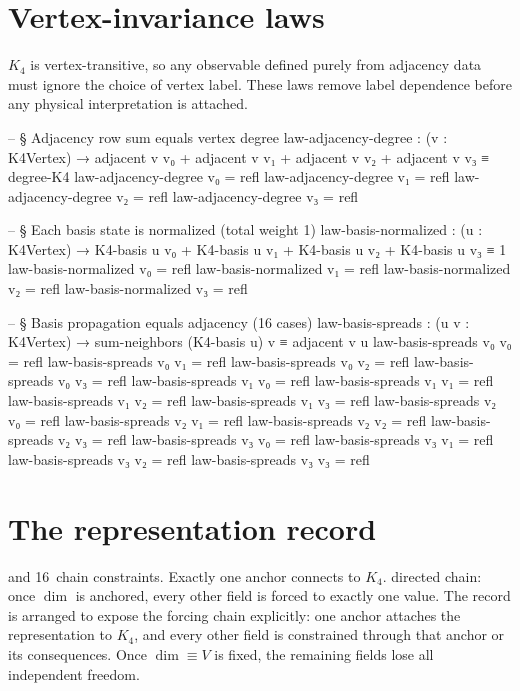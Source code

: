 \documentclass[11pt,a4paper]{book}
\begin{document}
\section{Vertex-invariance laws}

$K_4$ is vertex-transitive, so any observable defined purely from adjacency data must ignore the choice of vertex label. These laws remove label dependence before any physical interpretation is attached.

\begin{code}
-- § Adjacency row sum equals vertex degree
law-adjacency-degree : (v : K4Vertex) →
  adjacent v v₀ + adjacent v v₁ + adjacent v v₂ + adjacent v v₃ ≡ degree-K4
law-adjacency-degree v₀ = refl
law-adjacency-degree v₁ = refl
law-adjacency-degree v₂ = refl
law-adjacency-degree v₃ = refl

-- § Each basis state is normalized (total weight 1)
law-basis-normalized : (u : K4Vertex) →
  K4-basis u v₀ + K4-basis u v₁ + K4-basis u v₂ + K4-basis u v₃ ≡ 1
law-basis-normalized v₀ = refl
law-basis-normalized v₁ = refl
law-basis-normalized v₂ = refl
law-basis-normalized v₃ = refl

-- § Basis propagation equals adjacency (16 cases)
law-basis-spreads : (u v : K4Vertex) →
  sum-neighbors (K4-basis u) v ≡ adjacent v u
law-basis-spreads v₀ v₀ = refl
law-basis-spreads v₀ v₁ = refl
law-basis-spreads v₀ v₂ = refl
law-basis-spreads v₀ v₃ = refl
law-basis-spreads v₁ v₀ = refl
law-basis-spreads v₁ v₁ = refl
law-basis-spreads v₁ v₂ = refl
law-basis-spreads v₁ v₃ = refl
law-basis-spreads v₂ v₀ = refl
law-basis-spreads v₂ v₁ = refl
law-basis-spreads v₂ v₂ = refl
law-basis-spreads v₂ v₃ = refl
law-basis-spreads v₃ v₀ = refl
law-basis-spreads v₃ v₁ = refl
law-basis-spreads v₃ v₂ = refl
law-basis-spreads v₃ v₃ = refl
\end{code}


\section{The representation record}

and 16~chain constraints.  Exactly one anchor connects to $K_4$.
directed chain: once $\dim$ is anchored, every other field is forced
to exactly one value.
The record is arranged to expose the forcing chain explicitly: one anchor attaches the representation to $K_4$, and every other field is constrained through that anchor or its consequences. Once $\dim \equiv V$ is fixed, the remaining fields lose all independent freedom.
\end{document}
